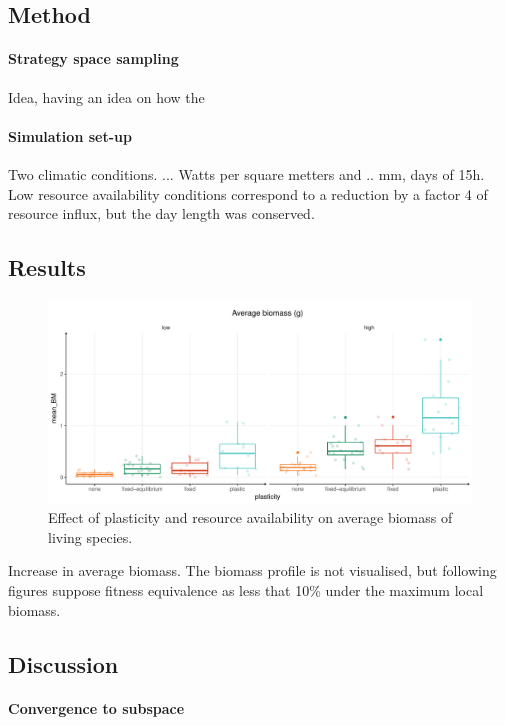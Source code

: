 \subsection{Method}

\paragraph{Strategy space sampling}
Idea, having an idea on how the 

\paragraph{Simulation set-up}
Two climatic conditions. ... Watts per square metters and .. mm, days of 15h. Low resource availability conditions correspond to a reduction by a factor 4 of resource influx, but the day length was conserved.

\subsection{Results}


\begin{figure}\label{fig:w_ini_p_as_r}
\includegraphics[width = \textwidth]{./2_PP/Figures/plot_BM_allocation.pdf}
\caption{Effect of plasticity and resource availability on average biomass of living species.}
\end{figure}
Increase in average biomass. The biomass profile is not visualised, but following figures suppose fitness equivalence as less that 10\% under the maximum local biomass.

\subsection{Discussion}

\paragraph{Convergence to subspace}

